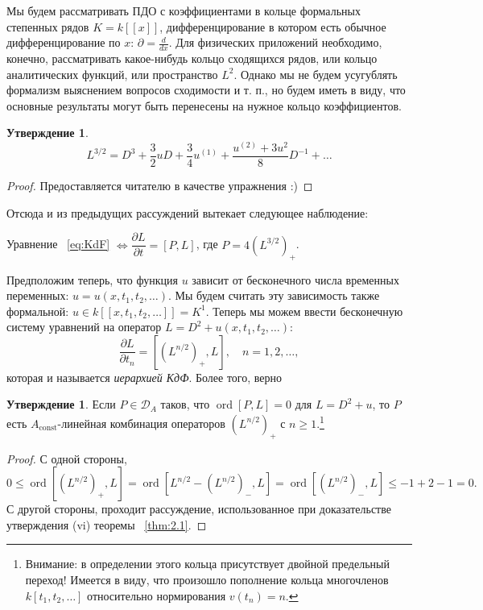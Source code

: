\documentclass{article}
\theoremstyle{definition}
\theoremstyle{definition} %
\theoremstyle{remark}     %
\theoremstyle{definition}
\theoremstyle{definition}
\theoremstyle{definition}
\newtheorem{statement}[theorem]{Утверждение}
\theoremstyle{definition}
\theoremstyle{definition}
\theoremstyle{definition}
\theoremstyle{definition}
\theoremstyle{definition}
\begin{document}
Мы будем рассматривать ПДО с коэффициентами в кольце формальных степенных рядов \(K = k[[x]]\), дифференцирование в котором есть обычное дифференцирование по \(x\): \(\partial = \frac{d}{dx}\). Для физических приложений необходимо, конечно, рассматривать какое-нибудь кольцо сходящихся рядов, или кольцо аналитических функций, или пространство \(L^2\). Однако мы не будем усугублять формализм выяснением вопросов сходимости и т. п., но будем иметь в виду, что основные результаты могут быть перенесены на нужное кольцо коэффициентов.

\begin{statement}
\[
L^{3/2} = D^3 + \frac{3}{2}uD + \frac{3}{4}u^{(1)} + \frac{u^{(2)} + 3u^2}{8}D^{-1} + \dots
\]
\end{statement}

\begin{proof}
Предоставляется читателю в качестве упражнения :)
\end{proof}

Отсюда и из предыдущих рассуждений вытекает следующее наблюдение:

Уравнение ~\ref{eq:KdF} \( \iff \dfrac{\partial L}{\partial t} = [P, L] \), где \(P = 4(L^{3/2})_+\).

Предположим теперь, что функция \(u\) зависит от бесконечного числа временных переменных: \(u = u(x, t_1, t_2, \dots)\). Мы будем считать эту зависимость также формальной: \(u \in k[[x, t_1, t_2, \dots]] = K^1\). Теперь мы можем ввести бесконечную систему уравнений на оператор \(L = D^2 + u(x, t_1, t_2, \dots)\):
\begin{equation*}\label{eq:KdF_n}
\frac{\partial L}{\partial t_n} = [(L^{n/2})_+, L], \quad n = 1, 2, \dots, \tag*{(КдФ$)_n$}
\end{equation*}
которая и называется \emph{иерархией КдФ}. Более того, верно

\begin{statement} Если \(P \in \mathcal{D}_A\) таков, что \(\operatorname{ord}[P, L] = 0\) для \(L = D^2 + u\), то \(P\) есть \(A_{\text{const}}\)-линейная комбинация операторов \((L^{n/2})_+\) с \(n \ge 1\).\footnote{Внимание: в определении этого кольца присутствует двойной предельный переход! Имеется в виду, что произошло пополнение кольца многочленов \(k[t_1, t_2, \dots]\) относительно нормирования \(v(t_n) = n\).}
\end{statement}


\begin{proof} С одной стороны,
\[
0 \leq \operatorname{ord} \left[ (L^{n/2})_+, L \right] = \operatorname{ord} \left[ L^{n/2} - (L^{n/2})_-, L \right] = \operatorname{ord} \left[ (L^{n/2})_-, L \right] \leq -1 + 2 - 1 = 0.
\]
С другой стороны, проходит рассуждение, использованное при доказательстве утверждения (vi) теоремы ~\ref{thm:2.1}.
\end{proof}
\end{document}
